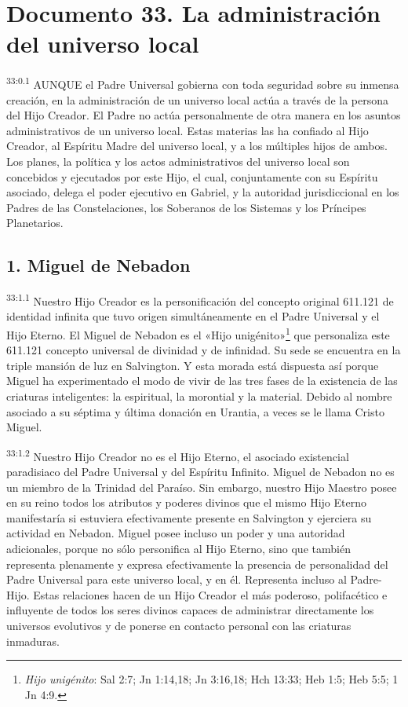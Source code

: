 \chapter{Documento 33. La administración del universo local}
\par
\textsuperscript{33:0.1} AUNQUE el Padre Universal gobierna con toda seguridad sobre su inmensa creación, en la administración de un universo local actúa a través de la persona del Hijo Creador. El Padre no actúa personalmente de otra manera en los asuntos administrativos de un universo local. Estas materias las ha confiado al Hijo Creador, al Espíritu Madre del universo local, y a los múltiples hijos de ambos. Los planes, la política y los actos administrativos del universo local son concebidos y ejecutados por este Hijo, el cual, conjuntamente con su Espíritu asociado, delega el poder ejecutivo en Gabriel, y la autoridad jurisdiccional en los Padres de las Constelaciones, los Soberanos de los Sistemas y los Príncipes Planetarios.

\section*{1. Miguel de Nebadon}
\par
\textsuperscript{33:1.1} Nuestro Hijo Creador es la personificación del concepto original
611.121 de identidad infinita que tuvo origen simultáneamente en el Padre Universal y el Hijo Eterno. El Miguel de Nebadon es el «Hijo unigénito»\footnote{\textit{Hijo unigénito}: Sal 2:7; Jn 1:14,18; Jn 3:16,18; Hch 13:33; Heb 1:5; Heb 5:5; 1 Jn 4:9.} que personaliza este 611.121{\textordmasculine} concepto universal de divinidad y de infinidad. Su sede se encuentra en la triple mansión de luz en Salvington. Y esta morada está dispuesta así porque Miguel ha experimentado el modo de vivir de las tres fases de la existencia de las criaturas inteligentes: la espiritual, la morontial y la material. Debido al nombre asociado a su séptima y última donación en Urantia, a veces se le llama Cristo Miguel.

\par
\textsuperscript{33:1.2} Nuestro Hijo Creador no es el Hijo Eterno, el asociado existencial paradisiaco del Padre Universal y del Espíritu Infinito. Miguel de Nebadon no es un miembro de la Trinidad del Paraíso. Sin embargo, nuestro Hijo Maestro posee en su reino todos los atributos y poderes divinos que el mismo Hijo Eterno manifestaría si estuviera efectivamente presente en Salvington y ejerciera su actividad en Nebadon. Miguel posee incluso un poder y una autoridad adicionales, porque no sólo personifica al Hijo Eterno, sino que también representa plenamente y expresa efectivamente la presencia de personalidad del Padre Universal para este universo local, y en él. Representa incluso al Padre-Hijo. Estas relaciones hacen de un Hijo Creador el más poderoso, polifacético e influyente de todos los seres divinos capaces de administrar directamente los universos evolutivos y de ponerse en contacto personal con las criaturas inmaduras.

